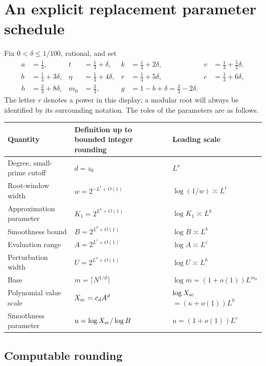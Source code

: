 \section{An explicit replacement parameter schedule}
\label{sec:parameters}

Fix \(0<\delta\le1/100\), rational, and set
\begin{align*}
 a&=\frac13,& t&=\frac13+\delta,& k&=\frac13+2\delta,
 &v&=\frac13+\frac52\delta,\\
 b&=\frac13+3\delta,& \eta&=\frac13+4\delta,
 &r&=\frac13+5\delta,& c&=\frac13+6\delta,\\
 h&=\frac23+8\delta,& m_0&=\frac23,
 &g&=1-b+\delta=\frac23-2\delta.
\end{align*}
The letter \(r\) denotes a power in this display; a modular root will
always be identified by its surrounding notation.  The roles of the
parameters are as follows.
\begin{center}
\begin{tabular}{@{}p{}p{}p{}@{}}
\toprule
Quantity & Definition up to bounded integer rounding & Leading scale \\
\midrule
Degree, small-prime cutoff & \(d=z_0\) & \(L^a\) \\
Root-window width & \(w=2^{-L^t+O(1)}\) & \(\log(1/w)\asymp L^t\) \\
Approximation parameter & \(K_1=2^{L^k+O(1)}\) & \(\log K_1\asymp L^k\) \\
Smoothness bound & \(B=2^{L^b+O(1)}\) & \(\log B\asymp L^b\) \\
Evaluation range & \(A=2^{L^c+O(1)}\) & \(\log A\asymp L^c\) \\
Perturbation width & \(U=2^{L^h+O(1)}\) & \(\log U\asymp L^h\) \\
Base & \(m=\lceil N^{1/d}\rceil\) & \(\log m=(1+o(1))L^{m_0}\) \\
Polynomial value scale & \(X_{\rm sc}=c_dA^d\) & \(\log X_{\rm sc}\) \(=(\kappa+o(1))L^h\) \\
Smoothness parameter & \(u=\log X_{\rm sc}/\log B\) & \(u=(1+o(1))L^r\) \\
\bottomrule
\end{tabular}
\end{center}

\subsection{Computable rounding}

